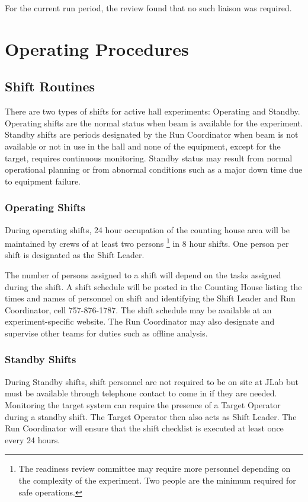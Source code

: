 \documentclass[10pt]{article}
\begin{document}
For the current run period, the review found that no such liaison was required.


\section{Operating Procedures}

\subsection{Shift Routines}

There are two types of shifts for active hall experiments:
Operating and Standby. Operating shifts are the normal status
when beam is available for the experiment. Standby shifts are periods 
designated by the Run Coordinator when beam is not available or not in
use in the hall and none of the equipment, except for the target, requires
continuous monitoring. Standby status may result from normal operational
planning or from abnormal conditions such as a major down time due to
equipment failure.


\subsubsection{Operating Shifts}

During operating shifts, 24 hour occupation of the counting house area will 
be maintained by crews of at least two persons
\footnote{\label{fn2}The readiness review committee may require more 
personnel depending on the complexity of the experiment. Two people are 
the minimum required for safe operations.} 
in 8 hour shifts. One person per shift is designated as the Shift Leader.

The number of persons assigned to a shift will depend on the tasks assigned 
during the shift. A shift schedule will be posted in the Counting House 
listing the times and names of personnel on shift and identifying the 
Shift Leader and Run Coordinator, cell 757-876-1787. The shift schedule may be available at 
an experiment-specific website. The Run Coordinator may also designate 
and supervise other teams for duties such as offline analysis.

\subsubsection{Standby Shifts}

During Standby shifts, shift personnel are not required to be on site at 
JLab but must be available through telephone contact to come in if they
are needed.  Monitoring the target system can require the presence of a
Target Operator during a standby shift.  The Target Operator then also
acts as Shift Leader.  The Run Coordinator will ensure that the shift
checklist is executed at least once every 24 hours.
\end{document}
